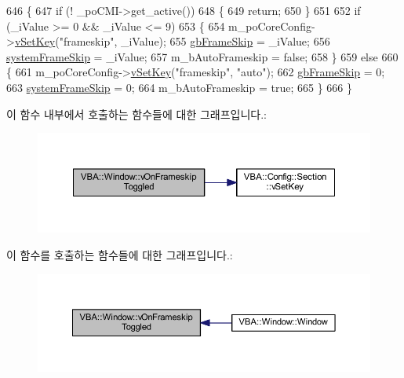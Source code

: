 \begin{DoxyCode}
646 \{
647   \textcolor{keywordflow}{if} (! \_poCMI->get\_active())
648   \{
649     \textcolor{keywordflow}{return};
650   \}
651 
652   \textcolor{keywordflow}{if} (\_iValue >= 0 && \_iValue <= 9)
653   \{
654     m\_poCoreConfig->\mbox{\hyperlink{class_v_b_a_1_1_config_1_1_section_a57e1b95cbea40db71c093381beff4b0e}{vSetKey}}(\textcolor{stringliteral}{"frameskip"}, \_iValue);
655     \mbox{\hyperlink{_g_b_8cpp_a2139360d32d74969f470ef05414ecaf8}{gbFrameSkip}}      = \_iValue;
656     \mbox{\hyperlink{system_8cpp_ac88aa402d015fda6917b150c22a28968}{systemFrameSkip}}  = \_iValue;
657     m\_bAutoFrameskip = \textcolor{keyword}{false};
658   \}
659   \textcolor{keywordflow}{else}
660   \{
661     m\_poCoreConfig->\mbox{\hyperlink{class_v_b_a_1_1_config_1_1_section_a57e1b95cbea40db71c093381beff4b0e}{vSetKey}}(\textcolor{stringliteral}{"frameskip"}, \textcolor{stringliteral}{"auto"});
662     \mbox{\hyperlink{_g_b_8cpp_a2139360d32d74969f470ef05414ecaf8}{gbFrameSkip}}      = 0;
663     \mbox{\hyperlink{system_8cpp_ac88aa402d015fda6917b150c22a28968}{systemFrameSkip}}  = 0;
664     m\_bAutoFrameskip = \textcolor{keyword}{true};
665   \}
666 \}
\end{DoxyCode}
이 함수 내부에서 호출하는 함수들에 대한 그래프입니다.\+:
\nopagebreak
\begin{figure}[H]
\begin{center}
\leavevmode
\includegraphics[width=350pt]{class_v_b_a_1_1_window_a1d969d55fcb1a69d13d3a29c9365e699_cgraph}
\end{center}
\end{figure}
이 함수를 호출하는 함수들에 대한 그래프입니다.\+:
\nopagebreak
\begin{figure}[H]
\begin{center}
\leavevmode
\includegraphics[width=350pt]{class_v_b_a_1_1_window_a1d969d55fcb1a69d13d3a29c9365e699_icgraph}
\end{center}
\end{figure}
\mbox{\label{class_v_b_a_1_1_window_aa7cf1b717713eb050de751b12ddfe72a}} 
